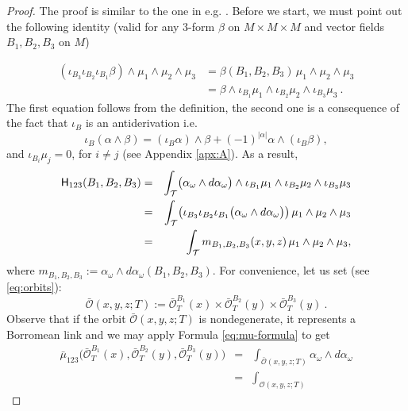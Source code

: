 \documentclass[12pt]{article}
\numberwithin{equation}{section}
\newcommand{\no}{\noindent}
\begin{document}
\begin{proof}
 The proof is similar to the one in e.g. \cite{Vogel03}. Before we start, we must point out
 the following identity (valid for any 3-form $\beta$ on $M\times M\times M$ and vector fields 
 $B_1,B_2,B_3$ on $M$)
 
 \begin{equation}\label{eq:iota-volume}
 \begin{split}
(\iota_{B_3}\iota_{B_2}\iota_{B_1}\beta)\wedge\mu_1\wedge\mu_2\wedge\mu_3 & =
\beta(B_1,B_2,B_3)\,\mu_1\wedge\mu_2\wedge\mu_3\\
 & =\beta\wedge\iota_{B_1}\mu_1\wedge\iota_{B_2}\mu_2\wedge\iota_{B_3}\mu_3\ .
 \end{split}
 \end{equation}
  \no The first equation follows from the definition, the second one is a consequence of the fact that $\iota_B$ is an antiderivation i.e.
 \begin{equation}\label{eq:iota-antiderivation}
  \iota_B(\alpha\wedge\beta)=(\iota_B\alpha)\wedge\beta+(-1)^{|\alpha|}\alpha\wedge(\iota_B\beta),
 \end{equation}
 and $\iota_{B_i}\mu_j=0$, for $i\neq j$ (see Appendix \ref{apx:A}). As a result,
 \begin{eqnarray*}
\notag  \mathsf{H}_{123}(B_1,B_2,B_3) & = & \int_{\mathcal{T}} \bigl(\alpha_\omega\wedge d\alpha_\omega\bigr)\wedge \iota_{B_1}\mu_1\wedge \iota_{B_2}\mu_2\wedge \iota_{B_3}\mu_3\\
& = & \int_\mathcal{T} \bigl(\iota_{B_3}\iota_{B_2}\iota_{B_1}\bigl(\alpha_\omega\wedge d\alpha_\omega\bigr)\bigr)\,\mu_1\wedge\mu_2\wedge\mu_3\\
\label{eq:m-function}  & = & \int_\mathcal{T} m_{B_1,B_2,B_3}(x,y,z)\,\mu_1\wedge \mu_2\wedge \mu_3,
\end{eqnarray*}
where $m_{B_1,B_2,B_3}:=\alpha_\omega\wedge d\alpha_\omega(B_1,B_2,B_3)$. For convenience, let us set (see \eqref{eq:orbits}):
\[
 \bar{\mathscr{O}}(x,y,z;T):=\bar{\mathscr{O}}^{B_1}_T(x)\times \bar{\mathscr{O}}^{B_2}_T(y)\times\bar{\mathscr{O}}^{B_3}_T(y)\ .
\]
\no Observe that if the orbit $\bar{\mathscr{O}}(x,y,z;T)$ is nondegenerate, it represents a Borromean link and we may apply Formula \eqref{eq:mu-formula} to get
\begin{eqnarray*}
\bar{\mu}_{123}\bigl(\bar{\mathscr{O}}^{B_1}_T(x),\bar{\mathscr{O}}^{B_2}_T(y),\bar{\mathscr{O}}^{B_3}_T(y)\big)
& = & \int_{\bar{\mathscr{O}}(x,y,z;T)}
\alpha_\omega\wedge d\alpha_\omega\\
& = & \int_{\mathscr{O}(x,y,z;T)}

\end{eqnarray*}
\end{proof}
\end{document}
